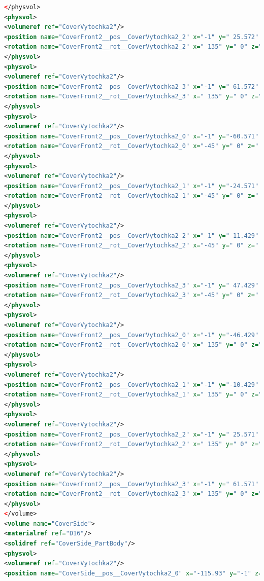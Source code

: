 \begin{lstlisting}[language=XML, firstline=1, lastline=89]
</physvol>
<physvol>
<volumeref ref="CoverVytochka2"/>
<position name="CoverFront2__pos__CoverVytochka2_2" x="-1" y=" 25.572" z=" 8.858" unit="mm"/>
<rotation name="CoverFront2__rot__CoverVytochka2_2" x=" 135" y=" 0" z=" 0" unit="deg"/>
</physvol>
<physvol>
<volumeref ref="CoverVytochka2"/>
<position name="CoverFront2__pos__CoverVytochka2_3" x="-1" y=" 61.572" z=" 8.858" unit="mm"/>
<rotation name="CoverFront2__rot__CoverVytochka2_3" x=" 135" y=" 0" z=" 0" unit="deg"/>
</physvol>
<physvol>
<volumeref ref="CoverVytochka2"/>
<position name="CoverFront2__pos__CoverVytochka2_0" x="-1" y="-60.571" z="-9.285" unit="mm"/>
<rotation name="CoverFront2__rot__CoverVytochka2_0" x="-45" y=" 0" z=" 0" unit="deg"/>
</physvol>
<physvol>
<volumeref ref="CoverVytochka2"/>
<position name="CoverFront2__pos__CoverVytochka2_1" x="-1" y="-24.571" z="-9.285" unit="mm"/>
<rotation name="CoverFront2__rot__CoverVytochka2_1" x="-45" y=" 0" z=" 0" unit="deg"/>
</physvol>
<physvol>
<volumeref ref="CoverVytochka2"/>
<position name="CoverFront2__pos__CoverVytochka2_2" x="-1" y=" 11.429" z="-9.285" unit="mm"/>
<rotation name="CoverFront2__rot__CoverVytochka2_2" x="-45" y=" 0" z=" 0" unit="deg"/>
</physvol>
<physvol>
<volumeref ref="CoverVytochka2"/>
<position name="CoverFront2__pos__CoverVytochka2_3" x="-1" y=" 47.429" z="-9.285" unit="mm"/>
<rotation name="CoverFront2__rot__CoverVytochka2_3" x="-45" y=" 0" z=" 0" unit="deg"/>
</physvol>
<physvol>
<volumeref ref="CoverVytochka2"/>
<position name="CoverFront2__pos__CoverVytochka2_0" x="-1" y="-46.429" z="-24.427" unit="mm"/>
<rotation name="CoverFront2__rot__CoverVytochka2_0" x=" 135" y=" 0" z=" 0" unit="deg"/>
</physvol>
<physvol>
<volumeref ref="CoverVytochka2"/>
<position name="CoverFront2__pos__CoverVytochka2_1" x="-1" y="-10.429" z="-24.427" unit="mm"/>
<rotation name="CoverFront2__rot__CoverVytochka2_1" x=" 135" y=" 0" z=" 0" unit="deg"/>
</physvol>
<physvol>
<volumeref ref="CoverVytochka2"/>
<position name="CoverFront2__pos__CoverVytochka2_2" x="-1" y=" 25.571" z="-24.427" unit="mm"/>
<rotation name="CoverFront2__rot__CoverVytochka2_2" x=" 135" y=" 0" z=" 0" unit="deg"/>
</physvol>
<physvol>
<volumeref ref="CoverVytochka2"/>
<position name="CoverFront2__pos__CoverVytochka2_3" x="-1" y=" 61.571" z="-24.427" unit="mm"/>
<rotation name="CoverFront2__rot__CoverVytochka2_3" x=" 135" y=" 0" z=" 0" unit="deg"/>
</physvol>
</volume>
<volume name="CoverSide">
<materialref ref="D16"/>
<solidref ref="CoverSide_PartBody"/>
<physvol>
<volumeref ref="CoverVytochka2"/>
<position name="CoverSide__pos__CoverVytochka2_0" x="-115.93" y="-1" z=" 25.928" unit="mm"/>

\end{lstlisting}
